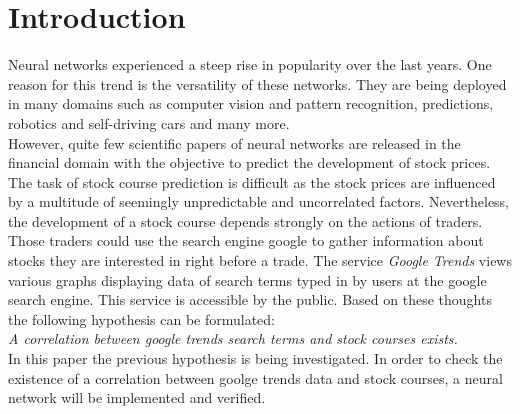 \section{Introduction}
\label{sec:introduction}
Neural networks experienced a steep rise in popularity over the last years. One reason for this trend is the versatility of these networks. They are being deployed in many domains such as computer vision and pattern recognition, predictions, robotics and self-driving cars and many more. 
\\
However, quite few scientific papers of neural networks are released in the financial domain with the objective to predict the development of stock prices. The task of stock course prediction is difficult as the stock prices are influenced by a multitude of seemingly unpredictable and uncorrelated factors. Nevertheless, the development of a stock course depends strongly on the actions of traders. Those traders could use the search engine google to gather information about stocks they are interested in right before a trade. The service \textit{Google Trends} views various graphs displaying data of search terms typed in by users at the google search engine. This service is accessible by the public. Based on these thoughts the following hypothesis can be formulated: 
\\
\textit{A correlation between google trends search terms and stock courses exists. } 
\\
In this paper the previous hypothesis is being investigated. In order to check the existence of a correlation between goolge trends data and stock courses, a neural network will be implemented and verified. 